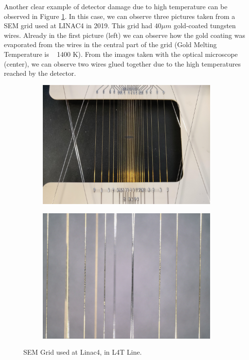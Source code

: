 Another clear example of detector damage due to high temperature can be observed in Figure \ref{fig:SEMLinac4damage}. In this case, we can observe three pictures taken from a SEM grid used at LINAC4 in 2019. This grid had $40 \mu m$ gold-coated tungsten wires. Already in the first picture (left) we can observe how the gold coating was evaporated from the wires in the central part of the grid (Gold Melting Temperature is ~ 1400 K). From the images taken with the optical microscope (center), we can observe two wires glued together due to the high temperatures reached by the detector. 

\begin{figure}[h]
    \centering
    \begin{subfigure}[b]{0.42\textwidth}
        \includegraphics[width=\textwidth]{SEMgridDamage/GridDamage1.jpg}
    \end{subfigure}
    \hspace{0.5cm}
    \begin{subfigure}[b]{0.4\textwidth}
        \includegraphics[width=\textwidth]{SEMgridDamage/GridDamage2.png}
    \end{subfigure}
    \caption{SEM Grid used at Linac4, in L4T Line.  }
    \label{fig:SEMLinac4damage}
\end{figure}

